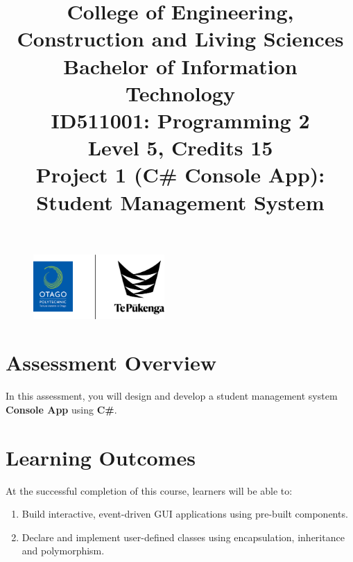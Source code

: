 \documentclass{article}
\author{}
\begin{document}
\begin{figure}
    \centering
    \includegraphics[width=50mm]{../../resources/img/logo.png}
\end{figure}

\title{College of Engineering, Construction and Living Sciences\\Bachelor of Information Technology\\ID511001: Programming 2\\Level 5, Credits 15\\\textbf{Project 1 (C\# Console App): Student Management System}}
\date{}
\maketitle

\section*{Assessment Overview}
In this assessment, you will design and develop a student management system \textbf{Console App} using \textbf{C\#}. 

\section*{Learning Outcomes}
At the successful completion of this course, learners will be able to:
\begin{enumerate}
    \item Build interactive, event-driven GUI applications using pre-built components.
    \item Declare and implement user-defined classes using encapsulation, inheritance and polymorphism.
\end{enumerate}
\end{document}
